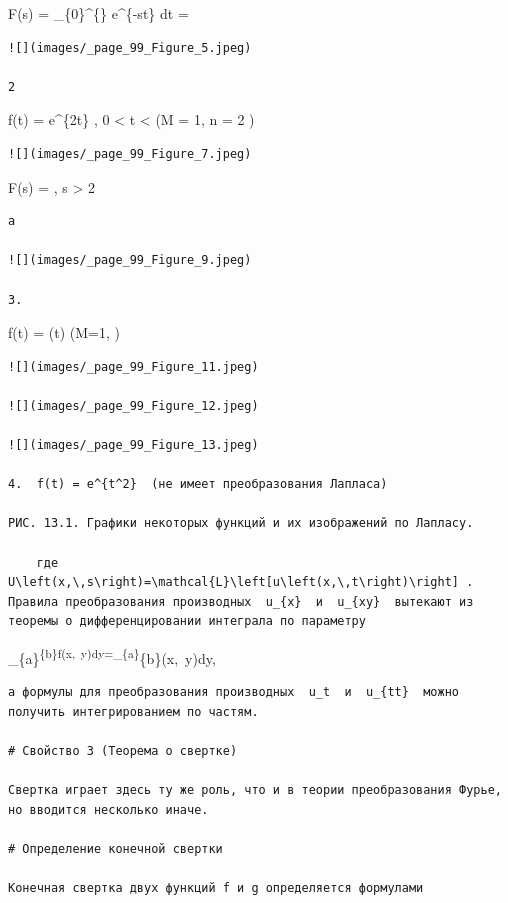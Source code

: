 \documentclass[
  ukrainian,
]{article}
\begin{document}
F(s) = \int\_\{0\}\^{}\{\infty\} e\^{}\{-st\} dt = 

\begin{verbatim}
![](images/_page_99_Figure_5.jpeg)

2
\end{verbatim}

f(t) = e\^{}\{2t\} , 0 \textless{} t \textless{} \infty (M = 1, n = 2 )

\begin{verbatim}
![](images/_page_99_Figure_7.jpeg)
\end{verbatim}

F(s) =  , s \textgreater{} 2

\begin{verbatim}
a

![](images/_page_99_Figure_9.jpeg)

3.
\end{verbatim}

f(t) = \sin(\omega t) (M=1, )

\begin{verbatim}
![](images/_page_99_Figure_11.jpeg)

![](images/_page_99_Figure_12.jpeg)

![](images/_page_99_Figure_13.jpeg)

4.  f(t) = e^{t^2}  (не имеет преобразования Лапласа)

РИС. 13.1. Графики некоторых функций и их изображений по Лапласу.

    где  U\left(x,\,s\right)=\mathcal{L}\left[u\left(x,\,t\right)\right] . Правила преобразования производных  u_{x}  и  u_{xy}  вытекают из теоремы о дифференцировании интеграла по параметру
\end{verbatim}

\int\_\{a\}\textsuperscript{\{b\}f\left(x,~y\right)dy=\int\_\{a\}}\{b\}\left(x,~y\right)dy,

\begin{verbatim}
а формулы для преобразования производных  u_t  и  u_{tt}  можно получить интегрированием по частям.

# Свойство 3 (Теорема о свертке)

Свертка играет здесь ту же роль, что и в теории преобразования Фурье, но вводится несколько иначе.

# Определение конечной свертки

Конечная свертка двух функций f и g определяется формулами
\end{verbatim}
\end{document}

